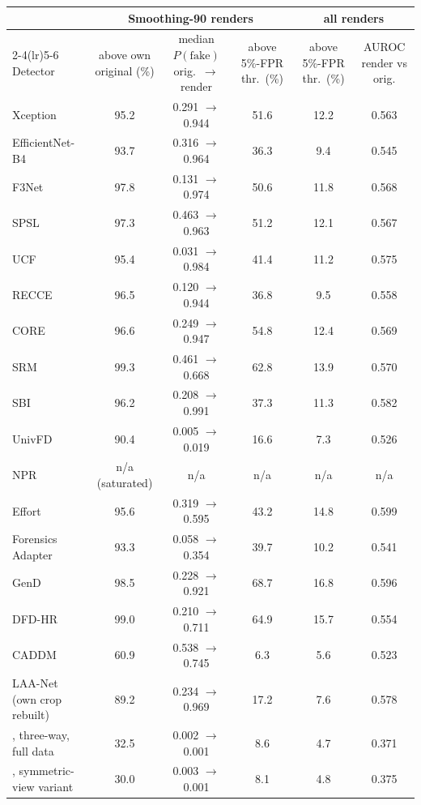 \begin{tabular}{@{}l ccc cc@{}}
\toprule
 & \multicolumn{3}{c}{Smoothing-90 renders} & \multicolumn{2}{c}{all renders} \\
\cmidrule(lr){2-4}\cmidrule(lr){5-6}
Detector & above own original (\%) & median $P(\text{fake})$ orig.\ $\rightarrow$ render & above 5\%-FPR thr.\ (\%) & above 5\%-FPR thr.\ (\%) & AUROC render vs orig. \\
\midrule
Xception & 95.2 & 0.291 $\rightarrow$ 0.944 & 51.6 & 12.2 & 0.563 \\
EfficientNet-B4 & 93.7 & 0.316 $\rightarrow$ 0.964 & 36.3 & 9.4 & 0.545 \\
F3Net & 97.8 & 0.131 $\rightarrow$ 0.974 & 50.6 & 11.8 & 0.568 \\
SPSL & 97.3 & 0.463 $\rightarrow$ 0.963 & 51.2 & 12.1 & 0.567 \\
UCF & 95.4 & 0.031 $\rightarrow$ 0.984 & 41.4 & 11.2 & 0.575 \\
RECCE & 96.5 & 0.120 $\rightarrow$ 0.944 & 36.8 & 9.5 & 0.558 \\
CORE & 96.6 & 0.249 $\rightarrow$ 0.947 & 54.8 & 12.4 & 0.569 \\
SRM & 99.3 & 0.461 $\rightarrow$ 0.668 & 62.8 & 13.9 & 0.570 \\
SBI~\cite{sbi} & 96.2 & 0.208 $\rightarrow$ 0.991 & 37.3 & 11.3 & 0.582 \\
UnivFD & 90.4 & 0.005 $\rightarrow$ 0.019 & 16.6 & 7.3 & 0.526 \\
NPR & n/a (saturated) & n/a & n/a & n/a & n/a \\
Effort~\cite{effort} & 95.6 & 0.319 $\rightarrow$ 0.595 & 43.2 & 14.8 & 0.599 \\
Forensics Adapter~\cite{forensicsadapter} & 93.3 & 0.058 $\rightarrow$ 0.354 & 39.7 & 10.2 & 0.541 \\
GenD~\cite{gend2026} & 98.5 & 0.228 $\rightarrow$ 0.921 & 68.7 & 16.8 & 0.596 \\
DFD-HR~\cite{dfdhr2026} & 99.0 & 0.210 $\rightarrow$ 0.711 & 64.9 & 15.7 & 0.554 \\
CADDM~\cite{caddm} & 60.9 & 0.538 $\rightarrow$ 0.745 & 6.3 & 5.6 & 0.523 \\
LAA-Net~\cite{laanet} (own crop rebuilt) & 89.2 & 0.234 $\rightarrow$ 0.969 & 17.2 & 7.6 & 0.578 \\
\midrule
\ours{}, three-way, full data & 32.5 & 0.002 $\rightarrow$ 0.001 & 8.6 & 4.7 & 0.371 \\
\ours{}, symmetric-view variant & 30.0 & 0.003 $\rightarrow$ 0.001 & 8.1 & 4.8 & 0.375 \\

\end{tabular}
